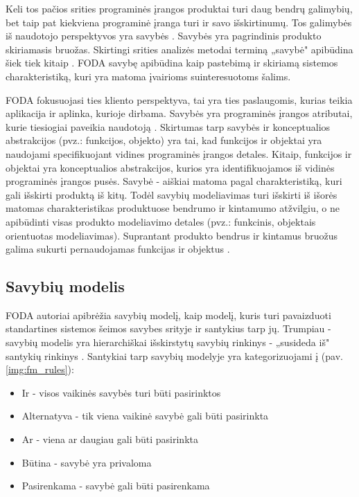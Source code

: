 \documentclass{VUMIFPSkursinis}
\begin{document}
Keli tos pačios srities programinės įrangos produktai turi daug bendrų galimybių, bet taip pat kiekviena programinė įranga turi ir savo išskirtinumų. Tos galimybės iš naudotojo perspektyvos yra savybės \cite{Kang1990}. Savybės yra pagrindinis produkto skiriamasis bruožas. Skirtingi srities analizės metodai terminą „savybė" apibūdina šiek tiek kitaip \cite{Lee2015}. FODA \cite{Kang1990} savybę apibūdina kaip pastebimą ir skiriamą sistemos charakteristiką, kuri yra matoma įvairioms suinteresuotoms šalims.

FODA fokusuojasi ties kliento perspektyva, tai yra ties paslaugomis, kurias teikia aplikacija ir aplinka, kurioje dirbama. Savybės yra programinės įrangos atributai, kurie tiesiogiai paveikia naudotoją \cite{Kang1990}. Skirtumas tarp savybės ir konceptualios abstrakcijos (pvz.: funkcijos, objekto) yra tai, kad funkcijos ir objektai yra naudojami specifikuojant vidines programinės įrangos detales. Kitaip, funkcijos ir objektai yra konceptualios abstrakcijos, kurios yra identifikuojamos iš vidinės programinės įrangos pusės. Savybė - aiškiai matoma  pagal charakteristiką, kuri gali išskirti produktą iš kitų. Todėl savybių modeliavimas turi išskirti iš išorės matomas charakteristikas produktuose bendrumo ir kintamumo atžvilgiu, o ne apibūdinti visas produkto modeliavimo detales (pvz.: funkcinis, objektais orientuotas modeliavimas). Suprantant produkto bendrus ir kintamus bruožus galima sukurti pernaudojamas funkcijas ir objektus \cite{Lee2015}.

\subsection{Savybių modelis}

FODA \cite{Kang1990} autoriai apibrėžia savybių modelį, kaip modelį, kuris turi pavaizduoti standartines sistemos šeimos savybes srityje ir santykius tarp jų. Trumpiau - savybių modelis yra hierarchiškai išskirstytų savybių rinkinys - „susideda iš" santykių rinkinys \cite{Kang1990, Batory2005}. Santykiai tarp savybių  modelyje yra kategorizuojami į (pav. \ref{img:fm_rules}):
\begin{itemize}
\item Ir - visos vaikinės savybės turi būti pasirinktos
\item Alternatyva - tik viena vaikinė savybė gali būti pasirinkta 
\item Ar - viena ar daugiau gali būti pasirinkta
\item Būtina - savybė yra privaloma
\item Pasirenkama - savybė gali būti pasirenkama
\end{itemize}
\end{document}
